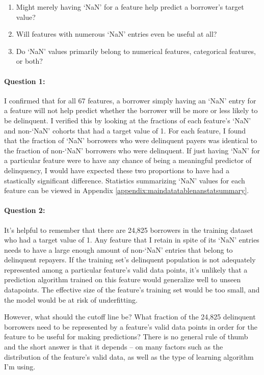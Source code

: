 \documentclass[12pt, letterpaper]{article}
\begin{document}
\begin{enumerate}
  \item Might merely having `NaN' for a feature help predict a borrower's target value?
  \item Will features with numerous `NaN' entries even be useful at all?
  \item Do `NaN' values primarily belong to numerical features, categorical features, or both?
\end{enumerate}

\paragraph{Question 1:}
I confirmed that for all 67 features, a borrower simply having an `NaN' entry for a feature will not help predict whether the borrower will be more or less likely to be delinquent. I verified this by looking at the fractions of each feature's `NaN' and non-`NaN' cohorts that had a target value of 1. For each feature, I found that the fraction of `NaN' borrowers who were delinquent payers was identical to the fraction of non-`NaN' borrowers who were delinquent. If just having `NaN' for a particular feature were to have any chance of being a meaningful predictor of delinquency, I would have expected these two proportions to have had a stastically significant difference. Statistics summarizing `NaN' values for each feature can be viewed in Appendix \ref{appendix:maindatatablenanstatsummary}.

\paragraph{Question 2:}
It's helpful to remember that there are 24,825 borrowers in the training dataset who had a target value of 1. Any feature that I retain in spite of its `NaN' entries needs to have a large enough amount of non-`NaN' entries that belong to delinquent repayers. If the training set's delinquent population is not adequately represented among a particular feature's valid data points, it's unlikely that a prediction algorithm trained on this feature would generalize well to unseen datapoints. The effective size of the feature's training set would be too small, and the model would be at risk of underfitting.

However, what should the cutoff line be? What fraction of the 24,825 delinquent borrowers need to be represented by a feature's valid data points in order for the feature to be useful for making predictions? There is no general rule of thumb and the short answer is that it depends -- on many factors such as the distribution of the feature's valid data, as well as the type of learning algorithm I'm using.
\end{document}
